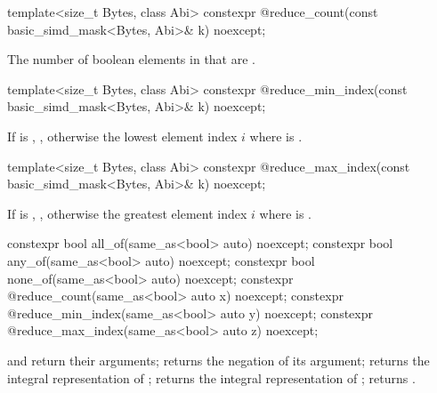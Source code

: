 \begin{itemdecl}
template<size_t Bytes, class Abi>
  constexpr @\simdsizetype@ reduce_count(const basic_simd_mask<Bytes, Abi>& k) noexcept;
\end{itemdecl}

\begin{itemdescr}
  \pnum\returns
  The number of boolean elements in  that are .
\end{itemdescr}

\begin{itemdecl}
template<size_t Bytes, class Abi>
  constexpr @\simdsizetype@ reduce_min_index(const basic_simd_mask<Bytes, Abi>& k) noexcept;
\end{itemdecl}

\begin{itemdescr}
  \pnum\returns
  If  is , , otherwise the lowest
  element index $i$ where  is .
\end{itemdescr}

\begin{itemdecl}
template<size_t Bytes, class Abi>
  constexpr @\simdsizetype@ reduce_max_index(const basic_simd_mask<Bytes, Abi>& k) noexcept;
\end{itemdecl}

\begin{itemdescr}
  \pnum\returns
  If  is , , otherwise the greatest
  element index $i$ where  is .
\end{itemdescr}

\begin{itemdecl}
constexpr bool all_of(same_as<bool> auto) noexcept;
constexpr bool any_of(same_as<bool> auto) noexcept;
constexpr bool none_of(same_as<bool> auto) noexcept;
constexpr @\simdsizetype@ reduce_count(same_as<bool> auto x) noexcept;
constexpr @\simdsizetype@ reduce_min_index(same_as<bool> auto y) noexcept;
constexpr @\simdsizetype@ reduce_max_index(same_as<bool> auto z) noexcept;
\end{itemdecl}

\begin{itemdescr}
  \pnum\returns
   and  return their arguments; 
  returns the negation of its argument;  returns the
  integral representation of ;  returns the
  integral representation of ;  returns
  .
\end{itemdescr}

